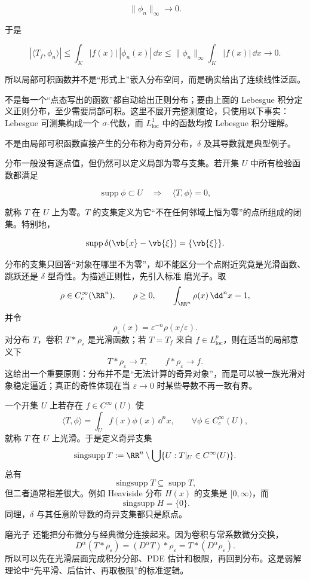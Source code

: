 \[
\|\phi_n\|_\infty\to0.
\]

于是

\[
|\langle T_f,\phi_n\rangle|
\le\int_K|f(x)|\,|\phi_n(x)|\,\dd x
\le\|\phi_n\|_\infty\int_K|f(x)|\,\dd x\to0.
\]

所以局部可积函数并不是``形式上''嵌入分布空间，而是确实给出了连续线性泛函。

不是每一个``点态写出的函数''都自动给出正则分布；要由上面的 Lebesgue 积分定义正则分布，至少需要局部可积。这里不展开完整测度论，只使用以下事实：Lebesgue 可测集构成一个 $\sigma$-代数，而 $L^1_{\mathrm{loc}}$ 中的函数均按 Lebesgue 积分理解。

不是由局部可积函数直接产生的分布称为奇异分布，$\delta$ 及其导数就是典型例子。

分布一般没有逐点值，但仍然可以定义局部为零与支集。若开集 $U$ 中所有检验函数都满足

\[
\operatorname{supp}\phi\subset U
\quad\Longrightarrow\quad
\langle T,\phi\rangle=0,
\]

就称 $T$ 在 $U$ 上为零。$T$ 的支集定义为它``不在任何邻域上恒为零''的点所组成的闭集。特别地，

\[
\operatorname{supp}\delta(\vb{x}-\vb{\xi})=\{\vb{\xi}\}.
\]

分布的支集只回答``对象在哪里不为零''，却不能区分一个点附近究竟是光滑函数、跳跃还是 $\delta$ 型奇性。为描述正则性，先引入标准 磨光子。取
\[
\rho\in C_c^\infty(\RR^n),
\qquad
\rho\ge0,
\qquad
\int_{\RR^n}\rho(x)\,\dd^n x=1,
\]
并令
\[
\rho_\varepsilon(x)=\varepsilon^{-n}\rho(x/\varepsilon).
\]
对分布 $T$，卷积 $T*\rho_\varepsilon$ 是光滑函数；若 $T=T_f$ 来自 $f\in L^p_{\mathrm{loc}}$，则在适当的局部意义下
\[
T*\rho_\varepsilon\longrightarrow T,
\qquad
f*\rho_\varepsilon\longrightarrow f.
\]
这给出一个重要原则：分布并不是``无法计算的奇异对象''，而是可以被一族光滑对象稳定逼近；真正的奇性体现在当 $\varepsilon\to0$ 时某些导数不再一致有界。

一个开集 $U$ 上若存在 $f\in C^\infty(U)$ 使
\[
\langle T,\phi\rangle
=\int_U f(x)\phi(x)\,\dd^n x,
\qquad
\forall\phi\in C_c^\infty(U),
\]
就称 $T$ 在 $U$ 上光滑。于是定义奇异支集
\[
{
\operatorname{singsupp}T
:=
\RR^n\setminus
\bigcup\{U:T|_U\in C^\infty(U)\}
}.
\]
总有
\[
\operatorname{singsupp}T\subseteq\operatorname{supp}T,
\]
但二者通常相差很大。例如 Heaviside 分布 $H(x)$ 的支集是 $[0,\infty)$，而
\[
\operatorname{singsupp}H=\{0\}.
\]
同理，$\delta$ 与其任意阶导数的奇异支集都只是原点。

磨光子 还能把分布微分与经典微分连接起来。因为卷积与常系数微分交换，
\[
D^\alpha(T*\rho_\varepsilon)
=(D^\alpha T)*\rho_\varepsilon
=T*(D^\alpha\rho_\varepsilon).
\]
所以可以先在光滑层面完成积分分部、PDE 估计和极限，再回到分布。这是弱解理论中``先平滑、后估计、再取极限''的标准逻辑。
